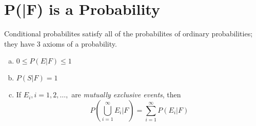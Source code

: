 \section{P(|F) is a Probability}
Conditional probabilites satisfy all of the probabilites of ordinary probabilities; they have 3 axioms of a probability. 
\begin{enumerate}[a. ]
    \item $0\leq P(E|F)\leq 1$
    \item $P(S|F) = 1$
    \item If $E_i, i= 1,2,\dots,$ are \textit{mutually exclusive events}, then \[P\left(\bigcup_{i=1}^\infty E_i|F\right) = \sum^\infty_{i=1} P\left(E_i|F\right)\]
\end{enumerate}